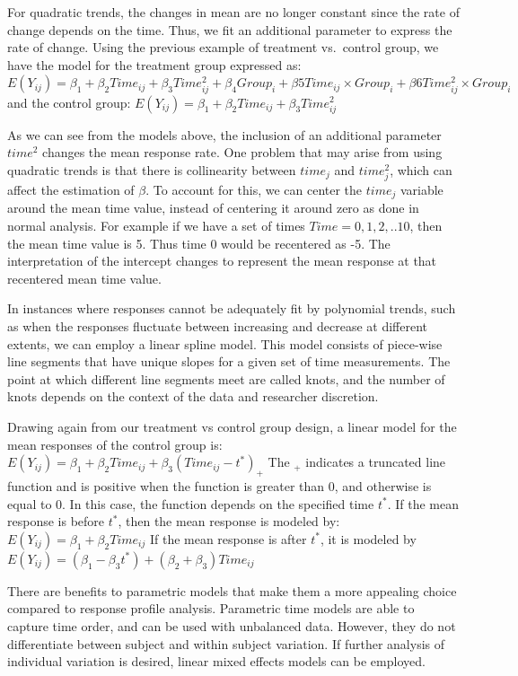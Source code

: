 \documentclass[12pt, twoside]{amherstthesis}
\theoremstyle{definition}
\theoremstyle{definition}
\theoremstyle{definition}
\theoremstyle{remark}
\begin{document}
For quadratic trends, the changes in mean are no longer constant since the rate of change depends on the time. Thus, we fit an additional parameter to express the rate of change.
Using the previous example of treatment vs.~control group, we have the model for the treatment group expressed as:
\(E(Y_{ij}) = \beta_1 + \beta_2Time_{ij}+\beta_3Time^2_{ij}+\beta_4Group_i + \beta5Time_{ij} \times Group_i + \beta6Time^2_{ij} \times Group_i\) and the control group: \(E(Y_{ij}) = \beta_1 + \beta_2Time_{ij}+\beta_3Time^2_{ij}\)

As we can see from the models above, the inclusion of an additional parameter \(time^2\) changes the mean response rate. One problem that may arise from using quadratic trends is that there is collinearity between \(time_j\) and \(time^2_j\), which can affect the estimation of \(\beta\). To account for this, we can center the \(time_j\) variable around the mean time value, instead of centering it around zero as done in normal analysis. For example if we have a set of times \(Time = {0,1,2,..10}\), then the mean time value is 5. Thus time 0 would be recentered as -5. The interpretation of the intercept changes to represent the mean response at that recentered mean time value.

In instances where responses cannot be adequately fit by polynomial trends, such as when the responses fluctuate between increasing and decrease at different extents, we can employ a linear spline model. This model consists of piece-wise line segments that have unique slopes for a given set of time measurements. The point at which different line segments meet are called knots, and the number of knots depends on the context of the data and researcher discretion.

Drawing again from our treatment vs control group design, a linear model for the mean responses of the control group is: \(E(Y_{ij}) = \beta_1 + \beta_2Time_{ij}+ \beta_3(Time_{ij}-t^*)_+\) The \(_+\) indicates a truncated line function and is positive when the function is greater than 0, and otherwise is equal to 0. In this case, the function depends on the specified time \(t^*\). If the mean response is before \(t^*\), then the mean response is modeled by: \(E(Y_{ij}) = \beta_1 + \beta_2Time_{ij}\) If the mean response is after \(t^*\), it is modeled by
\(E(Y_{ij}) = (\beta_1-\beta_3t^*) + (\beta_2+\beta_3)Time_{ij}\)

There are benefits to parametric models that make them a more appealing choice compared to response profile analysis. Parametric time models are able to capture time order, and can be used with unbalanced data. However, they do not differentiate between subject and within subject variation. If further analysis of individual variation is desired, linear mixed effects models can be employed.
\end{document}
